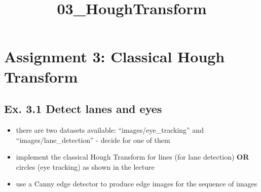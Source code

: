 \documentclass[11pt]{article}
\title{03\_HoughTransform}
\providecommand{\tightlist}{%
      \setlength{\itemsep}{0pt}\setlength{\parskip}{0pt}}
\begin{document}
    
    
    \maketitle
    
    

    
    \hypertarget{assignment-3-classical-hough-transform}{%
\section{Assignment 3: Classical Hough
Transform}\label{assignment-3-classical-hough-transform}}

\hypertarget{ex.-3.1-detect-lanes-and-eyes}{%
\subsection{Ex. 3.1 Detect lanes and
eyes}\label{ex.-3.1-detect-lanes-and-eyes}}

\begin{itemize}
\tightlist
\item
  there are two datasets available: ``images/eye\_tracking'' and
  ``images/lane\_detection'' - decide for one of them
\item
  implement the classical Hough Transform for lines (for lane detection)
  \textbf{OR} circles (eye tracking) as shown in the lecture
\item
  use a Canny edge detector to produce edge images for the sequence of
  images
\end{itemize}
\end{document}
